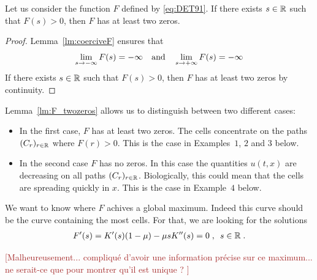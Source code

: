 \documentclass[11pt]{amsart}
\newcommand{\diff}{\,\mathrm{d}}
\newcommand{\ndr}[1]{\textcolor{brown}{[#1]}}
\begin{document}
    \begin{lemma}
    \label{lm:F_twozeros}
    Let us consider the function $F$ defined by \eqref{eq:DET91}. If there exists $s \in \mathbb{R}$ such that $F(s) > 0$, then $F$ has at least two zeros.  
    \end{lemma}
    \begin{proof}
        Lemma~\ref{lm:coerciveF} ensures that 
        \begin{equation*}
            \lim_{s \to -\infty} F(s) = -\infty 
            \quad \text{and} \quad
            \lim_{s \to +\infty} F(s) = -\infty 
        \end{equation*}
        If there exists $s \in \mathbb{R}$ such that $F(s) > 0$, then $F$ has at least two zeros by continuity. 
    \end{proof}

    Lemma~\ref{lm:F_twozeros} allows us to distinguish between two different cases:
    \begin{itemize}
        \item In the first case, $F$ has at least two zeros. The cells concentrate on the paths $(C_r)_{r\in\mathbb{R}}$ where $F(r)> 0$. This is the case in Examples~$1$, $2$ and $3$ below. 
        \item In the second case $F$ has no zeros. In this case the quantities $u(t,x)$ are decreasing on all paths $(C_r)_{r \in \mathbb{R}}$. Biologically, this could mean that the cells are spreading quickly in $x$. This is the case in Example~$4$ below. 
    \end{itemize}

    We want to know where $F$ achives a global maximum. Indeed this curve should be the curve containing the most cells. For that, we are looking for the solutions
    \begin{align*}
        F'(s) = K'(s) (1-\mu) - \mu s K''(s) = 0
        \; , \enspace
        s \in \mathbb{R}
        \; .
    \end{align*}

    \ndr{Malheureusement... compliqué d'avoir une information précise sur ce maximum... ne serait-ce que pour montrer qu'il est unique ? }\\

\end{document}
